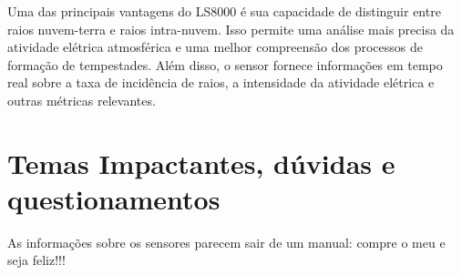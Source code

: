 \documentclass[a4paper, 12pt, onecolumn,singlespacing]{article}
\begin{document}
	Uma das principais vantagens do LS8000 é sua capacidade de distinguir entre raios nuvem-terra e raios intra-nuvem. Isso permite uma análise mais precisa da atividade elétrica atmosférica e uma melhor compreensão dos processos de formação de tempestades. Além disso, o sensor fornece informações em tempo real sobre a taxa de incidência de raios, a intensidade da atividade elétrica e outras métricas relevantes.
	
	\section{Temas Impactantes, dúvidas e questionamentos}
	
	As informações sobre os sensores parecem sair de um manual: compre o meu e seja feliz!!!
	
	
\end{document}
